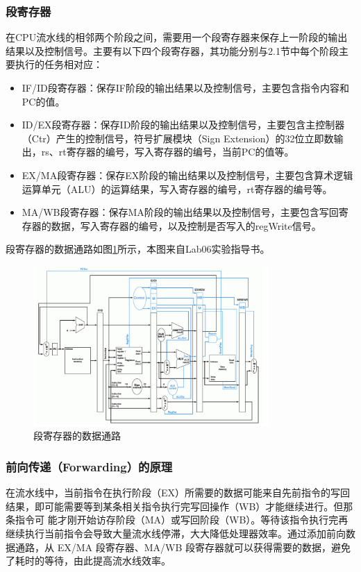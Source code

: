 \subsubsection{段寄存器}
在CPU流水线的相邻两个阶段之间，需要用一个段寄存器来保存上一阶段的输出结果以及控制信号。主要有以下四个段寄存器，其功能分别与2.1节中每个阶段主要执行的任务相对应：
\begin{itemize}
    \item IF/ID段寄存器：保存IF阶段的输出结果以及控制信号，主要包含指令内容和PC的值。
    \item ID/EX段寄存器：保存ID阶段的输出结果以及控制信号，主要包含主控制器（Ctr）产生的控制信号，符号扩展模块（Sign Extension）的32位立即数输出，rs、rt寄存器的编号，写入寄存器的编号，当前PC的值等。
    \item EX/MA段寄存器：保存EX阶段的输出结果以及控制信号，主要包含算术逻辑运算单元（ALU）的运算结果，写入寄存器的编号，rt寄存器的编号等。
    \item MA/WB段寄存器：保存MA阶段的输出结果以及控制信号，主要包含写回寄存器的数据，写入寄存器的编号，以及控制是否写入的regWrite信号。
\end{itemize}

段寄存器的数据通路如图\ref{piperegister}所示，本图来自Lab06实验指导书。
\begin{figure}[!h]
    \centering
    \includegraphics[width=0.8\textwidth]{./piperegister.png}
    \caption{段寄存器的数据通路}
    \label{piperegister}
\end{figure}

\subsubsection{前向传递（Forwarding）的原理}
在流水线中，当前指令在执行阶段（EX）所需要的数据可能来自先前指令的写回结果，即可能需要等到某条相关指令执行完写回操作（WB）才能继续进行。但那条指令可
能才刚开始访存阶段（MA）或写回阶段（WB）。等待该指令执行完再继续执行当前指令会导致大量流水线停滞，大大降低处理器效率。通过添加前向数据通路，从 EX/MA
段寄存器、MA/WB 段寄存器就可以获得需要的数据，避免了耗时的等待，由此提高流水线效率。


